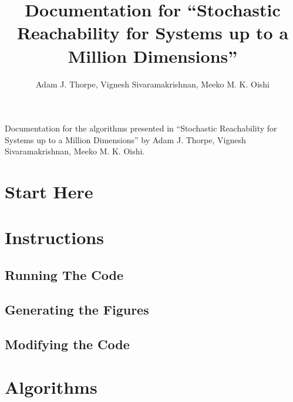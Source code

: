 \documentclass[11pt]{article}
\title{%
  Documentation for
  ``Stochastic Reachability for Systems up to a Million Dimensions''
}
\author{Adam J. Thorpe, Vignesh Sivaramakrishnan, Meeko M. K. Oishi}
\begin{document}

\maketitle


Documentation for the algorithms presented in ``Stochastic Reachability for Systems up to a Million Dimensions'' by Adam J. Thorpe, Vignesh Sivaramakrishnan, Meeko M. K. Oishi.

\tableofcontents

\printnoidxglossary[type=symbols,style=long,title={List of Symbols}]

\newpage


\section{Start Here}


\section{Instructions}

\subsection{Running The Code}

\subsection{Generating the Figures}

\subsection{Modifying the Code}


\section{Algorithms}
\end{document}

